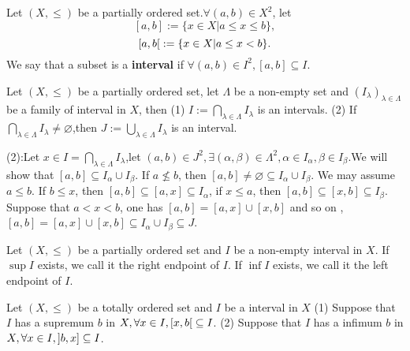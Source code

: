 \documentclass{book}
\numberwithin{equation}{section}
\begin{document}
\begin{definitionenv}
    Let $(X,\le)$ be a partially ordered set.$\forall (a,b)\in X^2$, let 
    $$[a,b]:=\{x\in X|a\le x\le b \},$$
     $$\interval[open right]{a}{b}:=\{x\in X|a\le x <b\}.$$ 
     We say that a subset is a \textbf{interval} if $\forall (a,b)\in I^2 ,[a,b]\subseteq I$.
\end{definitionenv}
\begin{propositionenv}
    Let $(X,\le)$ be a partially ordered set, let $\Lambda$ be a non-empty set and $(I_\lambda)_{\lambda\in \Lambda}$ be a family of interval in $X$, then 
    \newline
    (1) $\displaystyle I:=\bigcap _{\lambda\in \Lambda}I_\lambda$ is an intervals.
    \newline
    (2) If $\displaystyle \bigcap _{\lambda\in \Lambda}I_\lambda\not=\varnothing $,then $\displaystyle J:=\bigcup_{\lambda\in \Lambda}I_\lambda$ is an interval.
\end{propositionenv}
\begin{proofenv}
    \quad 
    \newline
    (2):Let $x\in I=\bigcap _{\lambda\in \Lambda}I_\lambda$,let $(a,b)\in J^2,\exists (\alpha,\beta )\in \Lambda^2,\alpha\in I_\alpha,\beta\in I_\beta$.We will show that $[a,b]\subseteq I_\alpha\cup I_\beta$. If $a\not\le b $, then $[a,b]\not =\varnothing\subseteq I_\alpha\cup I_\beta $. We may assume $a\le b $.
    \newline 
    If $b\le x$, then $[a,b]\subseteq [a,x]\subseteq I_\alpha$, if $x\le a $, then $[a,b]\subseteq [x,b]\subseteq I_\beta$. Suppose that $a<x<b$, one has $[a,b]=[a,x]\cup[x,b]$ and so on , $[a,b]=[a,x]\cup[x,b]\subseteq I_\alpha\cup I_\beta \subseteq J$.

\end{proofenv}
\begin{definitionenv}
    Let $(X,\le )$ be a partially ordered set and $I $ be a non-empty interval in $X$. 
    \newline
    If $\sup I$ exists, we call it the right endpoint of $I$.
    \newline
    If $\inf I$ exists, we call it the left endpoint of $I$.
\end{definitionenv}
\begin{propositionenv}
   Let $(X,\le )$ be a totally ordered set and $I $ be a interval in $X$ 
   \newline
   (1) Suppose that $I$ has a supremum $b$ in $X,\forall x\in I,\interval[open right]{x}{b}\subseteq I$.
   \newline
   (2) Suppose that $I$ has a infimum $b$ in $X,\forall x\in I,\interval[open left]{b}{x}\subseteq I$.
\end{propositionenv}
\end{document}
